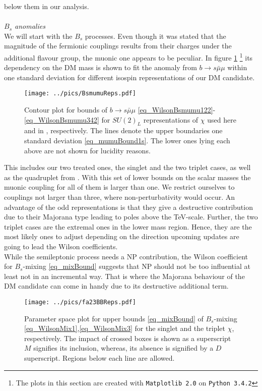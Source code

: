 below them in our analysis. 
\\ \\ \textit{$B_s$ anomalies}\\
\noindent We will start with the $B_s$ processes. Even though it was stated that the magnitude of the fermionic couplings results from their charges
under the additional flavour group, the muonic one appears to be peculiar. In figure \ref{pic_BsMumuReps} \footnote[3]{The plots in this section
are created with \texttt{Matplotlib 2.0}\cite{matplot} on \texttt{Python 3.4.2}\cite{Python}} its dependency on
the DM mass is shown to fit the anomaly from $b\rightarrow s\bar\mu\mu$ within one standard deviation for different isospin representations of our DM
candidate. 
\begin{figure}[t]
 \texttt{[image: ../pics/BsmumuReps.pdf]}
 \caption{Contour plot for bounds of $b\rightarrow s\bar\mu\mu$  \eqref{eq_WilsonBsmumu122}-\eqref{eq_WilsonBsmumu342} for  $SU(2)_L$ 
 representations of $\chi$ used here and in \cite{Grip}, respectively.  The lines denote the upper boundaries one standard deviation 
 \eqref{eq_mumuBound1s}. The lower ones lying each above are not shown for lucidity reasons.}
 \label{pic_BsMumuReps}
\end{figure}
This includes our two treated ones, the singlet and the two triplet cases, as well as the quadruplet from \cite{Grip}. 
With this set of lower bounds on the scalar masses the muonic coupling for all of them is larger than one. We restrict
ourselves to couplings not larger than three, where non-perturbativity would occur. An advantage of the odd representations is
that they give a destructive contribution due to their Majorana type leading to poles above the TeV-scale. Further, the two triplet cases
are the extremal ones in the lower mass region. Hence, they are the most likely ones to adjust depending on the direction upcoming updates are 
going to lead the Wilson coefficients.\\
\noindent While the semileptonic process needs a NP contribution, the Wilson coefficient 
for $B_s$-mixing \eqref{eq_mixBound} suggests that NP should not be too influential at least not in an incremental way. That is where the Majorana
behaviour of the DM candidate can come in handy due to its destructive additional term. 
\begin{figure}[t]
 \texttt{[image: ../pics/fa23BBReps.pdf]}
 \caption{Parameter space plot for upper bounds \eqref{eq_mixBound} of $B_s$-mixing \eqref{eq_WilsonMix1},\eqref{eq_WilsonMix3} for the singlet and 
 the triplet $\chi$, respectively. The impact of crossed boxes is shown as a superscript $M$ signifies its inclusion, whereas, its absence is
 signified by a $D$ superscript. Regions below each line are allowed.}
 \label{pic_BsMixRepsMajorana}
\end{figure}
